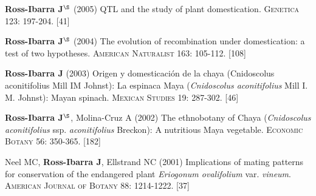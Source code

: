 \documentclass[letterpaper,10pt]{article}
\renewenvironment{itemize}{
  \begin{list}{}{
    \setlength{\leftmargin}{1.5em}
  }
}{
  \end{list}
}
\begin{document}
\begin{etaremune}
\item {\bf Ross-Ibarra J}$^\S$ (2005) QTL and the study of plant domestication.  \textsc{Genetica} 123: 197-204.
 [41]\\


\item {\bf Ross-Ibarra J}$^\S$ (2004) The evolution of recombination under domestication: a test of two hypotheses.  \textsc{American Naturalist} 163: 105-112.
 [108]\\


\item {\bf Ross-Ibarra J} (2003) Origen y domesticaci\'on de la chaya (Cnidoscolus aconitifolius Mill IM Johnst): La espinaca Maya (\emph{Cnidoscolus aconitifolius} Mill I. M. Johnst): Mayan spinach.  \textsc{Mexican Studies} 19: 287-302.
 [46]\\

\item {\bf Ross-Ibarra J}$^\S$, Molina-Cruz A (2002) The ethnobotany of Chaya (\emph{Cnidoscolus aconitifolius} ssp. \emph{aconitifolius} Breckon): A nutritious Maya vegetable. \textsc{Economic Botany} 56: 350-365.
 [182]\\

\item  Neel MC, {\bf Ross-Ibarra J}, Ellstrand NC (2001) Implications of mating patterns for conservation of the endangered plant \emph{Eriogonum ovalifolium} var. \emph{vineum}.  \textsc{American Journal of Botany} 88: 1214-1222.
 [37]\\
\end{etaremune}


\end{document}
